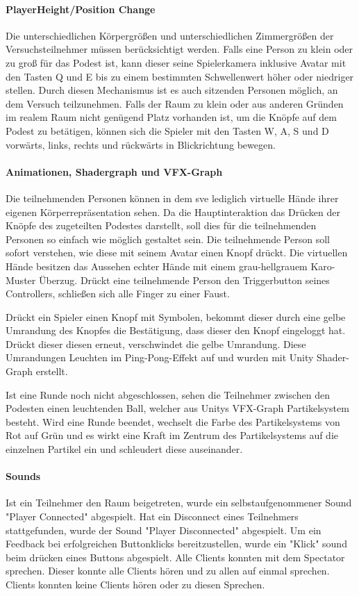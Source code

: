 \documentclass[a4paper,11pt]{article}%
\renewcommand{\\}{\vspace*{0.5\baselineskip} \newline}
\begin{document}
\paragraph{PlayerHeight/Position Change}
Die unterschiedlichen Körpergrößen und unterschiedlichen Zimmergrößen der Versuchsteilnehmer müssen berücksichtigt werden.
Falls eine Person zu klein oder zu groß für das Podest ist, kann dieser seine Spielerkamera inklusive Avatar mit den Tasten Q und E bis zu einem bestimmten Schwellenwert höher oder niedriger stellen. Durch diesen Mechanismus ist es auch sitzenden Personen möglich, an dem Versuch teilzunehmen.
Falls der Raum zu klein oder aus anderen Gründen im realem Raum nicht genügend Platz vorhanden ist, um die Knöpfe auf dem Podest zu betätigen, können sich die Spieler mit den Tasten W, A, S und D vorwärts, links, rechts und rückwärts in Blickrichtung bewegen.

\paragraph{Animationen, Shadergraph und VFX-Graph}
Die teilnehmenden Personen können in dem \ac{sve} lediglich virtuelle Hände ihrer eigenen Körperrepräsentation sehen. Da die Hauptinteraktion das Drücken der Knöpfe des zugeteilten Podestes darstellt, soll dies für die teilnehmenden Personen so einfach wie möglich gestaltet sein. Die teilnehmende Person soll sofort verstehen, wie diese mit seinem Avatar einen Knopf drückt. Die virtuellen Hände besitzen das Aussehen echter Hände mit einem grau-hellgrauem Karo-Muster Überzug. Drückt eine teilnehmende Person den Triggerbutton seines Controllers, schließen sich alle Finger zu einer Faust.

Drückt ein Spieler einen Knopf mit Symbolen, bekommt dieser durch eine gelbe Umrandung des Knopfes die Bestätigung, dass dieser den Knopf eingeloggt hat. Drückt dieser diesen erneut, verschwindet die gelbe Umrandung. Diese Umrandungen Leuchten im Ping-Pong-Effekt auf und wurden mit Unity Shader-Graph erstellt.

Ist eine Runde noch nicht abgeschlossen, sehen die Teilnehmer zwischen den Podesten einen leuchtenden Ball, welcher aus Unitys VFX-Graph Partikelsystem besteht. Wird eine Runde beendet, wechselt die Farbe des Partikelsystems von Rot auf Grün und es wirkt eine Kraft im Zentrum des Partikelsystems auf die einzelnen Partikel ein und schleudert diese auseinander.

\paragraph{Sounds}
Ist ein Teilnehmer den Raum beigetreten, wurde ein selbstaufgenommener Sound "Player Connected" abgespielt. Hat ein Disconnect eines Teilnehmers stattgefunden, wurde der Sound "Player Disconnected" abgespielt.
Um ein Feedback bei erfolgreichen Buttonklicks bereitzustellen, wurde ein "Klick" sound beim drücken eines Buttons abgespielt.
Alle Clients konnten mit dem Spectator sprechen. Dieser konnte alle Clients hören und zu allen auf einmal sprechen. Clients konnten keine Clients hören oder zu diesen Sprechen.
\end{document}
